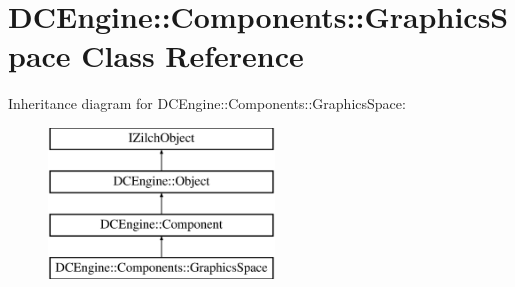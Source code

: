 \hypertarget{classDCEngine_1_1Components_1_1GraphicsSpace}{\section{D\-C\-Engine\-:\-:Components\-:\-:Graphics\-Space Class Reference}
\label{classDCEngine_1_1Components_1_1GraphicsSpace}
}
Inheritance diagram for D\-C\-Engine\-:\-:Components\-:\-:Graphics\-Space\-:\begin{figure}[H]
\begin{center}
\leavevmode
\includegraphics[height=4.000000cm]{classDCEngine_1_1Components_1_1GraphicsSpace}
\end{center}
\end{figure}
